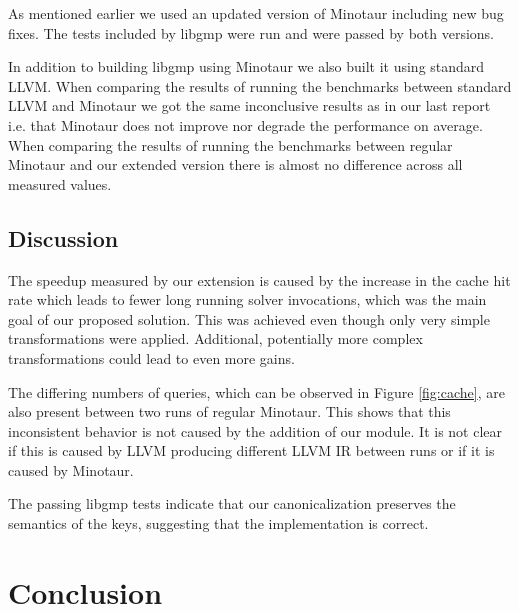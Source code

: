 	As mentioned earlier we used an updated version of Minotaur including new bug fixes.
	The tests included by libgmp were run and were passed by both versions.

	In addition to building libgmp using Minotaur we also built it using standard LLVM.
	When comparing the results of running the benchmarks between standard LLVM and Minotaur we got the same inconclusive results as in our last report i.e. that Minotaur does not improve nor degrade the performance on average.
	When comparing the results of running the benchmarks between regular Minotaur and our extended version there is almost no difference across all measured values.


	\subsection{Discussion}

	The speedup measured by our extension is caused by the increase in the cache hit rate which leads to fewer long running solver invocations, which was the main goal of our proposed solution.
	This was achieved even though only very simple transformations were applied.
	Additional, potentially more complex transformations could lead to even more gains.

	The differing numbers of queries, which can be observed in Figure \ref{fig:cache}, are also present between two runs of regular Minotaur.
	This shows that this inconsistent behavior is not caused by the addition of our module.
	It is not clear if this is caused by LLVM producing different LLVM IR between runs or if it is caused by Minotaur.


	The passing libgmp tests indicate that our canonicalization preserves the semantics of the keys, suggesting that the implementation is correct.

	\section{Conclusion}

